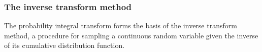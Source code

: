 \documentclass[9pt]{beamer}
\begin{document}
\begin{frame}
\frametitle{The inverse transform method}

The probability integral transform forms the basis of the inverse transform method, a procedure for sampling a continuous random variable given the inverse of its cumulative distribution function.


\vspace{0.1cm}



\vspace{0.1cm}


\end{frame}
\end{document}
